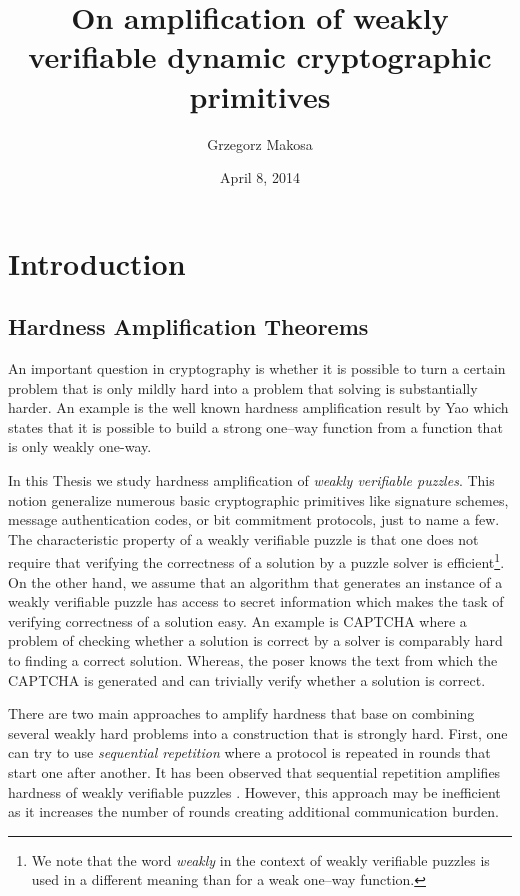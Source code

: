 \documentclass[11pt,a4paper,titlepage]{memoir}
\title{On amplification of weakly verifiable dynamic cryptographic primitives}
\author{Grzegorz Makosa}
\date{April 8, 2014}
\begin{document}
\frontmatter

%

\cleartorecto
\tableofcontents
\mainmatter

\chapter{Introduction}
\section{Hardness Amplification Theorems}
An important question in cryptography is whether it is possible to turn a certain problem
that is only mildly hard into a problem that solving is substantially harder.
An example is the well known hardness amplification result by Yao \cite{Goldreich:2000:FCB:519078}
which states that it is possible to build a strong one--way function from a function that is only weakly one-way.

In this Thesis we study hardness amplification of \textit{weakly verifiable puzzles}.
This notion generalize numerous basic cryptographic primitives like signature schemes,
message authentication codes, or bit commitment protocols, just to name a few.
The characteristic property of a weakly verifiable puzzle is that one does not require that verifying the correctness of a solution
by a puzzle solver is efficient\footnote{We note that the word \textit{weakly} in the context of weakly verifiable
puzzles is used in a different meaning than for a weak one--way function.}.
On the other hand, we assume that an algorithm that generates an instance of a weakly verifiable puzzle
has access to secret information which makes the task of verifying correctness of a solution easy.
An example is CAPTCHA where a problem of checking whether a solution is correct by a solver is comparably hard to finding a correct solution.
Whereas, the poser knows the text from which the CAPTCHA is generated and can trivially verify whether a solution is correct.

There are two main approaches to amplify hardness that base on combining several weakly hard problems into
a construction that is strongly hard. First, one can try to use \textit{sequential repetition} where a protocol is repeated
in rounds that start one after another. It has been observed that sequential repetition amplifies hardness
of weakly verifiable puzzles \cite{von2003captcha}. However, this approach may be inefficient as it increases
the number of rounds creating additional communication burden.
\end{document}
